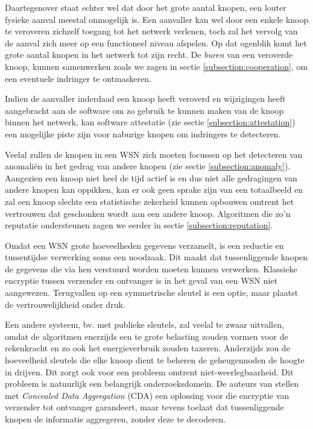 Daartegenover staat echter wel dat door het grote aantal knopen, een louter
fysieke aanval meestal onmogelijk is. Een aanvaller kan wel door een enkele
knoop te veroveren zichzelf toegang tot het netwerk verlenen, toch zal het
vervolg van de aanval zich meer op een functioneel niveau afspelen. Op dat
ogenblik komt het grote aantal knopen in het netwerk tot zijn recht. De
\emph{buren} van een veroverde knoop, kunnen samenwerken zoals we zagen in
sectie \ref{subsection:cooperation}, om een eventuele indringer te ontmaskeren.

Indien de aanvaller inderdaad een knoop heeft veroverd en wijzigingen heeft
aangebracht aan de software om zo gebruik te kunnen maken van de knoop binnen
het netwerk, kan software attestatie (zie sectie \ref{subsection:attestation})
een mogelijke piste zijn voor naburige knopen om indringers te detecteren.

Veelal zullen de knopen in een WSN zich moeten focussen op het detecteren van
anomali\"en in het gedrag van andere knopen (zie sectie
\ref{subsection:anomaly}). Aangezien een knoop niet heel de tijd actief is en
dus niet alle gedragingen van andere knopen kan oppikken, kan er ook geen
sprake zijn van een totaalbeeld en zal een knoop slechts een statistische
zekerheid kunnen opbouwen omtrent het vertrouwen dat geschonken wordt aan een
andere knoop. Algoritmen die zo'n reputatie ondersteunen zagen we eerder in
sectie \ref{subsection:reputation}.

Omdat een WSN grote hoeveelheden gegevens verzamelt, is een reductie en
tussentijdse verwerking soms een noodzaak. Dit maakt dat tussenliggende knopen
de gegevens die via hen verstuurd worden moeten kunnen verwerken. Klassieke
encryptie tussen verzender en ontvanger is in het geval van een WSN niet
aangewezen. Terugvallen op een symmetrische sleutel is een optie, maar plaatst
de vertrouwelijkheid onder druk.

Een andere systeem, bv. met publieke sleutels, zal veelal te zwaar uitvallen,
omdat de algoritmen enerzijds een te grote belasting zouden vormen voor de
rekenkracht en zo ook het energieverbruik zouden taxeren. Anderzijds zou de
hoeveelheid sleutels die elke knoop dient te beheren de geheugennoden de hoogte
in drijven. Dit zorgt ook voor een probleem omtrent niet-weerlegbaarheid. Dit
probleem is natuurlijk een belangrijk onderzoeksdomein. De auteurs van
\citep{girao2005cda} stellen met \emph{Concealed Data Aggregation} (CDA) een
oplossing voor die encryptie van verzender tot ontvanger garandeert, maar
tevens toelaat dat tussenliggende knopen de informatie aggregeren, zonder deze
te decoderen.

